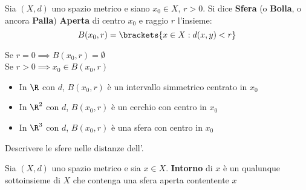 \begin{definition}
	Sia $(X,d)$ uno spazio metrico e siano $x_0 \in X$, $r > 0$. Si dice \textbf{Sfera} (o \textbf{Bolla}, o ancora \textbf{Palla}) \textbf{Aperta} di centro $x_0$ e raggio $r$ l'insieme:
	\[B(x_0,r)=\brackets{x\in X : d(x,y)<r}\]
\end{definition}
\begin{observation}
	Se $r=0 \implies B(x_0,r)=\emptyset$\\
	Se $r>0 \implies x_0\in B(x_0,r)$
\end{observation}
\begin{example}\leavevmode\vspace*{-\baselineskip}
	\begin{itemize}
		\item In $\R$ con $d$, $B(x_0,r)$ è un intervallo simmetrico centrato in $x_0$
		\item In $\R^2$ con $d$, $B(x_0,r)$ è un cerchio con centro in $x_0$
		\item In $\R^3$ con $d$, $B(x_0,r)$ è una sfera con centro in $x_0$
	\end{itemize}
\end{example}
\begin{exercise}
	Descrivere le sfere nelle distanze dell'.
\end{exercise}

\begin{definition}[Intorno]
	Sia $(X,d)$ uno spazio metrico e sia $x \in X$. \textbf{Intorno} di $x$ è un qualunque sottoinsieme di $X$ che contenga una sfera aperta contentente $x$
\end{definition}

